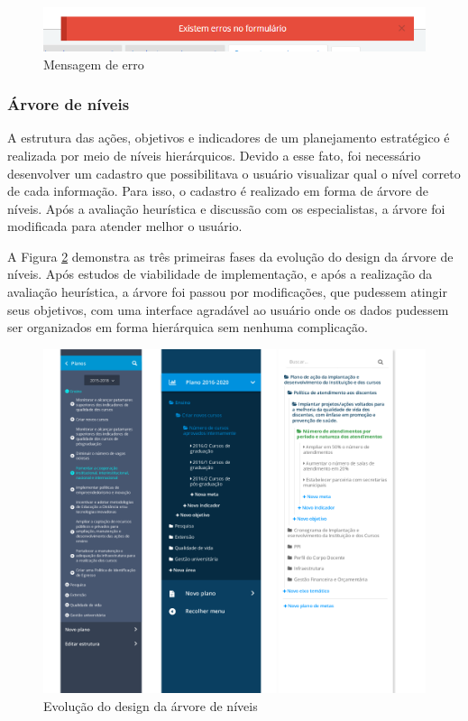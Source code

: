 \begin{figure}[H]
\centering
\includegraphics[width=1.1\textwidth]{images/erros.png}
\caption{Mensagem de erro}
\label{fig:erros}
\end{figure}

\subsubsection{Árvore de níveis}
A estrutura das ações, objetivos e indicadores de um planejamento estratégico é realizada por meio de níveis hierárquicos. Devido a esse fato, foi necessário desenvolver um cadastro que possibilitava o usuário visualizar qual o nível correto de cada informação. Para isso, o cadastro é realizado em forma de árvore de níveis. Após a avaliação heurística e discussão com os especialistas, a árvore foi modificada para atender melhor o usuário.

A Figura \ref{fig:arvore_geral} demonstra as três primeiras fases da evolução do design da árvore de níveis. Após estudos de viabilidade de implementação, e após a realização da avaliação heurística, a árvore foi passou por modificações, que pudessem atingir seus objetivos, com uma interface agradável ao usuário onde os dados pudessem ser organizados em forma hierárquica sem nenhuma complicação.



\begin{figure}[H]
\centering
\includegraphics[width=1.1\textwidth]{images/arvore.png}
\caption{Evolução do design da árvore de níveis}
\label{fig:arvore_geral}
\end{figure}

